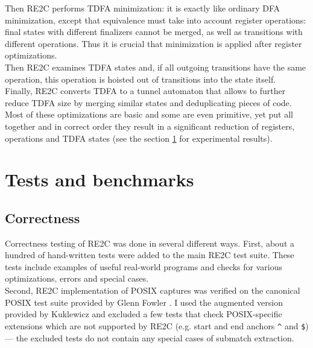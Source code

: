 \documentclass{article}
\theoremstyle{definition}
\begin{document}
\begin{multicols}{2}
Then RE2C performs TDFA minimization:
it is exactly like ordinary DFA minimization, except that
equivalence must take into account register operations:
final states with different finalizers cannot be merged, as well as transitions with different operations.
Thus it is crucial that minimization is applied after register optimizations.
\\

Then RE2C examines TDFA states and, if all outgoing transitions have the same operation,
this operation is hoisted out of transitions into the state itself.
\\

Finally, RE2C converts TDFA to a tunnel automaton \cite{Gro89}
that allows to further reduce TDFA size by merging similar states and deduplicating pieces of code.
\\

Most of these optimizations are basic and some are even primitive, yet put all together and in correct order
they result in a significant reduction of registers, operations and TDFA states
(see the section \ref{section_tests_and_benchmarks} for experimental results).

\section{Tests and benchmarks}\label{section_tests_and_benchmarks}

\subsection*{Correctness}

Correctness testing of RE2C was done in several different ways.
First, about a hundred of hand-written tests were added to the main RE2C test suite.
These tests include examples of useful real-world programs
and checks for various optimizations, errors and special cases.
\\

Second, RE2C implementation of POSIX captures was verified on the canonical POSIX test suite provided by Glenn Fowler \cite{Fow03}.
I used the augmented version provided by Kuklewicz \cite{Kuk09} and excluded a few tests that check POSIX-specific extensions
which are not supported by RE2C (e.g. start and end anchors \texttt{\^} and \texttt{\$}) ---
the excluded tests do not contain any special cases of submatch extraction.
\\


\end{multicols}
\end{document}
